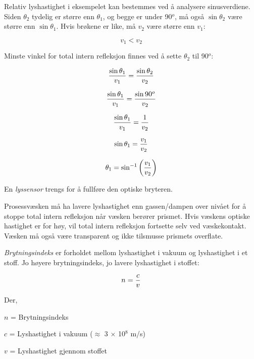 






Relativ lyshastighet i eksempelet kan bestemmes ved å analysere sinusverdiene.  Siden $\theta_2$ tydelig er større enn $\theta_1$, og begge er under 90$^{o}$, må også $\sin \theta_2$ være større enn $\sin \theta_1$.  Hvis brøkene er like, må $v_2$ være større enn $v_1$:

$$v_1 < v_2$$

\vskip 10pt

Minste vinkel for total intern refleksjon finnes ved å sette $\theta_2$ til 90$^{o}$:

$${{\sin \theta_1} \over v_1} = {{\sin \theta_2} \over v_2}$$

$${{\sin \theta_1} \over v_1} = {{\sin 90^o} \over v_2}$$

$${{\sin \theta_1} \over v_1} = {1 \over v_2}$$

$$\sin \theta_1 = {v_1 \over v_2}$$

$$\theta_1 = \sin^{-1} \left( {v_1 \over v_2} \right)$$

\vskip 10pt

En \textit{lyssensor} trengs for å fullføre den optiske bryteren.

\vskip 20pt

Prosessvæsken må ha lavere lyshastighet enn gassen/dampen over nivået for å stoppe total intern refleksjon når væsken berører prismet.  Hvis væskens optiske hastighet er for høy, vil total intern refleksjon fortsette selv ved væskekontakt.  Væsken må også være transparent og ikke tilsmusse prismets overflate.

\vskip 10pt

\textit{Brytningsindeks} er forholdet mellom lyshastighet i vakuum og lyshastighet i et stoff.  Jo høyere brytningsindeks, jo lavere lyshastighet i stoffet:

$$n = {c \over v}$$

\noindent
Der,

$n$ = Brytningsindeks

$c$ = Lyshastighet i vakuum ($\approx$ 3 $\times$ 10$^{8}$ m/s)

$v$ = Lyshastighet gjennom stoffet


